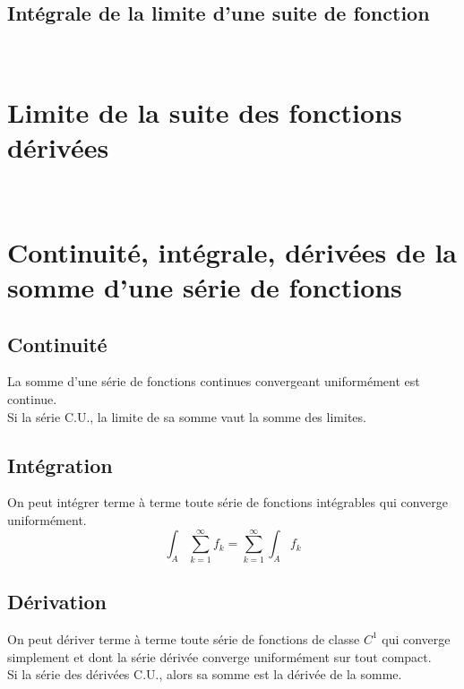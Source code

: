 \documentclass[11pt, a4paper, openany]{book}
\newcommand{\serie}{\sum_{k=1}^\infty}
\begin{document}
		\subsection{Intégrale de la limite d'une suite de fonction}
		\ 
							
							
		\section{Limite de la suite des fonctions dérivées}
		\ 
							
		\setcounter{section}{6}
		\section{Continuité, intégrale, dérivées de la somme d'une série de fonctions}
		\subsection{Continuité}
		La somme d'une série de fonctions continues convergeant uniformément est continue.\\
		Si la série C.U., la limite de sa somme vaut la somme des limites.
		\subsection{Intégration}
		On peut intégrer terme à terme toute série de fonctions intégrables qui converge uniformément.
		\begin{equation}
			\int_A \serie f_k = \serie \int_A f_k
		\end{equation}
							
		\subsection{Dérivation}
		On peut dériver terme à terme toute série de fonctions de classe $C^1$ qui converge simplement et dont la série dérivée converge uniformément sur tout compact.\\
		Si la série des dérivées C.U., alors sa somme est la dérivée de la somme.
							
\end{document}
